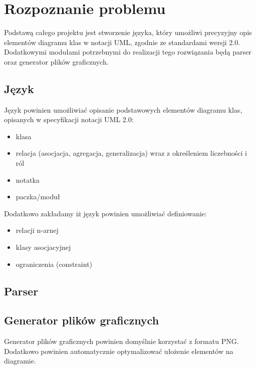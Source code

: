 \documentclass[a4paper,11pt]{article}
\begin{document}
\section{Rozpoznanie problemu}
Podstawą całego projektu jest stworzenie języka, który umożliwi precyzyjny opis elementów diagramu
klas w notacji UML, zgodnie ze standardami wersji 2.0.
Dodatkowymi modułami potrzebnymi do realizacji tego rozwiązania będą parser oraz generator plików
graficznych.

\subsection{Język}
Język powinien umożliwiać opisanie podstawowych elementów diagramu klas, opisanych w specyfikacji
notacji UML 2.0:
\begin{itemize}
\item{klasa}
\item{relacja (asocjacja, agregacja, generalizacja) wraz z określeniem liczebności i ról}
\item{notatka}
\item{paczka/moduł}
\end{itemize}
Dodatkowo zakładamy iż język powinien umożliwiać definiowanie:
\begin{itemize} %
\item{relacji n-arnej}
\item{klasy asocjacyjnej}
\item{ograniczenia (constraint)}
\end{itemize}

\subsection{Parser}

\subsection{Generator plików graficznych}
Generator plików graficznych powinien domyślnie korzystać z formatu PNG. Dodatkowo powinien
automatycznie optymalizować ułożenie elementów na diagramie. 
\end{document}
